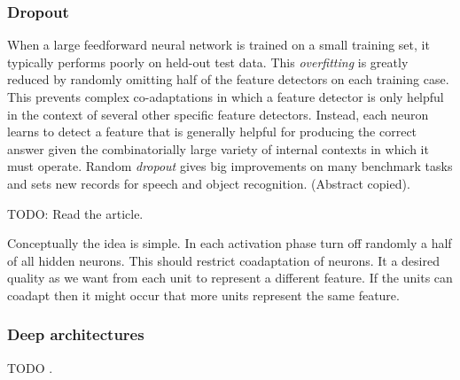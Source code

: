 \subsubsection{Dropout}
When a large feedforward neural network is trained on a small training set,
it typically performs poorly on held-out test data. This \emph{overfitting} is greatly
reduced by randomly omitting half of the feature detectors on each training
case. This prevents complex co-adaptations in which a feature detector is only
helpful in the context of several other specific feature detectors. Instead, each
neuron learns to detect a feature that is generally helpful for producing the
correct answer given the combinatorially large variety of internal contexts in
which it must operate. Random \emph{dropout} gives big improvements on many
benchmark tasks and sets new records for speech and object recognition.
 \cite{hinton2012improving} (Abstract copied). 
 
 TODO: Read the article. 
 
Conceptually the idea is simple. In each activation phase turn off randomly a half of all hidden neurons. This should restrict coadaptation of neurons. It a desired quality as we want from each unit to represent a different feature. If the units can coadapt then it might occur that more units represent the same feature. 

\subsubsection{Deep architectures} 
TODO  \cite{bengio2009learning}.

